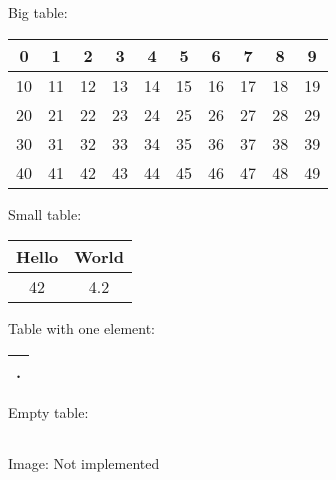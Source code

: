 \documentclass{article}
\begin{document}
Big table:    

\begin{table}[h!]
\centering
\begin{tabular}{ |c|c|c|c|c|c|c|c|c|c| }
\hline
0 & 1 & 2 & 3 & 4 & 5 & 6 & 7 & 8 & 9 \\
\hline
10 & 11 & 12 & 13 & 14 & 15 & 16 & 17 & 18 & 19 \\
\hline
20 & 21 & 22 & 23 & 24 & 25 & 26 & 27 & 28 & 29 \\
\hline
30 & 31 & 32 & 33 & 34 & 35 & 36 & 37 & 38 & 39 \\
\hline
40 & 41 & 42 & 43 & 44 & 45 & 46 & 47 & 48 & 49 \\
\hline
\end{tabular}
\end{table}
    

Small table:    

\begin{table}[h!]
\centering
\begin{tabular}{ |c|c| }
\hline
Hello & World \\
\hline
42 & 4.2 \\
\hline
\end{tabular}
\end{table}
   

Table with one element:    

\begin{table}[h!]
\centering
\begin{tabular}{ |c| }
\hline
. \\
\hline
\end{tabular}
\end{table}
 

Empty table:    

\begin{table}[h!]
\centering
\begin{tabular}{ |c| }
\hline

\hline
\end{tabular}
\end{table}
 

Image:
Not implemented      
\end{document}
